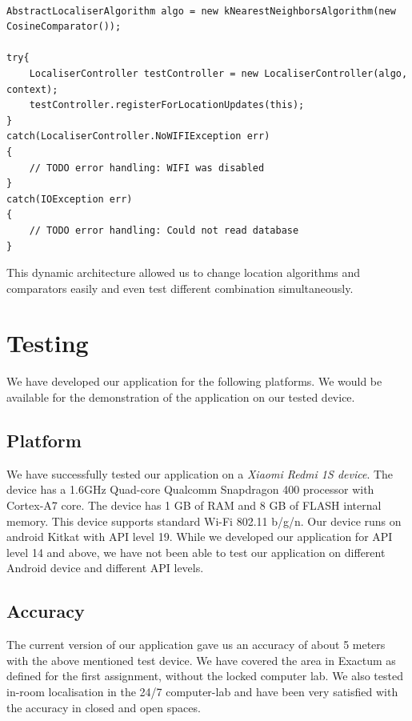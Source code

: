 \documentclass{article}
\begin{document}
  \begin{verbatim}

AbstractLocaliserAlgorithm algo = new kNearestNeighborsAlgorithm(new CosineComparator());

try{
    LocaliserController testController = new LocaliserController(algo, context);
    testController.registerForLocationUpdates(this);
}
catch(LocaliserController.NoWIFIException err)
{
    // TODO error handling: WIFI was disabled
}
catch(IOException err)
{
    // TODO error handling: Could not read database
}
\end{verbatim}

This dynamic architecture allowed us to change location algorithms and comparators easily and even test different combination simultaneously. 

\section{Testing}

We have developed our application for the following platforms. We would be available for the demonstration of the application on our tested device.

\subsection{Platform}

We have successfully tested our application on a \textit{Xiaomi Redmi 1S device}. The device has a 1.6GHz Quad-core Qualcomm Snapdragon 400 processor with Cortex-A7 core. The device has 1 GB of RAM and 8 GB of FLASH internal memory. This device supports standard Wi-Fi 802.11 b/g/n. Our device runs on android Kitkat with API level 19. While we developed our application for API level 14 and above, we have not been able to test our application on different Android device and different API levels.

\subsection{Accuracy} 

The current version of our application gave us an accuracy of about 5 meters with the above mentioned test device. We have covered the area in Exactum as defined for the first assignment, without the locked computer lab. We also tested in-room localisation in the 24/7 computer-lab and have been very satisfied with the accuracy in closed and open spaces.
\end{document}
